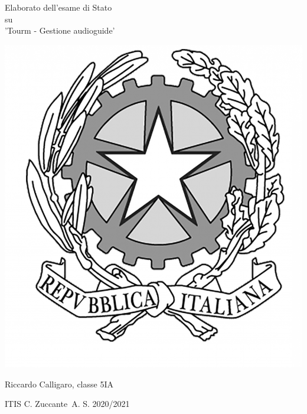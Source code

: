 \documentclass[12pt]{article}
\begin{document}
\begin{titlepage}
    \begin{center}
        \vspace*{1cm}

        \Huge
        Elaborato dell'esame di Stato \\ su \\ 'Tourm - Gestione audioguide'

        \vspace{1.5cm}

        \begin{center}
            \includegraphics[scale=0.08]{images/repubblica.png}
        \end{center}

        \normalsize
        Riccardo Calligaro, classe 5IA

        \vfill

        ITIS C. Zuccante\
        A. S. 2020/2021

    \end{center}
\end{titlepage}



\newpage
\end{document}
